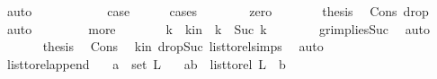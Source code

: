 \begin{isabellebody}
\ auto\ \ \ \ \isanewline
\ \ \ \ \isamarkupfalse%
\ \isamarkupfalse%
\ {\isacharquery}{\kern0pt}case\ \isanewline
\ \ \ \ \isamarkupfalse%
{\isacharparenleft}{\kern0pt}cases{\isacharparenright}{\kern0pt}\isanewline
\ \ \ \ \ \ \isamarkupfalse%
\ zero\isanewline
\ \ \ \ \isamarkupfalse%
\ \isamarkupfalse%
\ {\isacharquery}{\kern0pt}thesis\ \isamarkupfalse%
\ Cons\ drop{\isacharunderscore}{\kern0pt}{}\ \isamarkupfalse%
\ auto\isanewline
\ \ \isamarkupfalse%
\isanewline
\ \ \ \ \isamarkupfalse%
\ more\isanewline
\ \ \ \ \isamarkupfalse%
\ \isamarkupfalse%
\ k{}\ \ k{}{\isacharunderscore}{\kern0pt}in{\isacharcolon}{\kern0pt}\ \ {\isachardoublequoteopen}k\ {\isacharequal}{\kern0pt}\ Suc\ k{}{\isachardoublequoteclose}\isanewline
\ \ \ \ \ \ \isamarkupfalse%
\ gr{}{\isacharunderscore}{\kern0pt}implies{\isacharunderscore}{\kern0pt}Suc\ \isamarkupfalse%
\ auto\ \isanewline
\ \ \ \ \ \isamarkupfalse%
\ {\isacharquery}{\kern0pt}thesis\ \isamarkupfalse%
\ Cons\ \isamarkupfalse%
\ k{}{\isacharunderscore}{\kern0pt}in\ drop{\isacharunderscore}{\kern0pt}Suc\ list{\isacharunderscore}{\kern0pt}to{\isacharunderscore}{\kern0pt}rel{\isachardot}{\kern0pt}simps{\isacharparenleft}{\kern0pt}{}{\isacharparenright}{\kern0pt}\ \isamarkupfalse%
\ auto\isanewline
\ \ \ \ \isamarkupfalse%
\isanewline
\ \ \isamarkupfalse%
\isanewline
{}\isamarkupfalse%
%
\endisatagproof
{\isafoldproof}%
%
\isadelimproof
\isanewline
%
\endisadelimproof
\isanewline
{}\isamarkupfalse%
\ list{\isacharunderscore}{\kern0pt}to{\isacharunderscore}{\kern0pt}rel{\isacharunderscore}{\kern0pt}append{\isacharcolon}{\kern0pt}\isanewline
\ \ \ {\isachardoublequoteopen}a\ {\isasymin}\ set\ L{\isachardoublequoteclose}\isanewline
\ \ \ {\isachardoublequoteopen}{\isacharparenleft}{\kern0pt}a{\isacharcomma}{\kern0pt}b{\isacharparenright}{\kern0pt}\ {\isasymin}\ list{\isacharunderscore}{\kern0pt}to{\isacharunderscore}{\kern0pt}rel\ {\isacharparenleft}{\kern0pt}L\ {\isacharat}{\kern0pt}\ {\isacharbrackleft}{\kern0pt}b{\isacharbrackright}{\kern0pt}{\isacharparenright}{\kern0pt}{\isachardoublequoteclose}\ \isanewline
%
\isadelimproof

\end{isabellebody}
